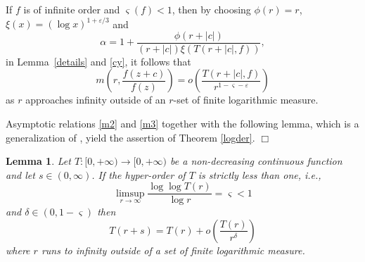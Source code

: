 \documentclass{amsart}
\newtheorem{lemma}[theorem]{Lemma}
\theoremstyle{definition}
\numberwithin{equation}{section}
\numberwithin{theorem}{section}
\begin{document}
If $f$ is of infinite order and $\varsigma(f)<1$, then by choosing
$\phi(r)= r$, $\xi(x)=(\log x)^{1+\varepsilon/3}$ and
    \begin{equation*}
    \alpha= 1+\frac{\phi(r+|c|)}{(r+|c|)\xi(T(r+|c|,f))},
    \end{equation*}
in Lemma~\ref{details} and \eqref{cy}, it follows that
    \begin{equation}\label{m3}
    m\left(r,\frac{f(z+c)}{f(z)}\right) =
    o\left(\frac{T(r+|c|,f)}{r^{1-\varsigma-\varepsilon}}\right)
    \end{equation}
as $r$ approaches infinity outside of an $r$-set of finite
logarithmic measure.

Asymptotic relations \eqref{m2} and
\eqref{m3} together with the following lemma, which is a
generalization of \cite[Lemma 2.1]{halburdk:07PLMS}, yield the
assertion of Theorem \ref{logder}. \hfill$\Box$

\begin{lemma}\label{technical}
Let $T:[0,+\infty)\to[0,+\infty)$ be a non-decreasing continuous
function and let $s\in(0,\infty)$. If the hyper-order of $T$ is
strictly less than one, i.e.,
    \begin{equation}\label{assu}
    \limsup_{r\to\infty}\frac{\log\log T(r)}{\log r}=\varsigma<1
    \end{equation}
and $\delta\in(0,1-\varsigma)$ then
   \begin{equation}\label{concl}
    T(r+s) = T(r)+ o\left(\frac{T(r)}{r^{\delta}}\right)
    \end{equation}
where $r$ runs to infinity outside of a set of finite logarithmic
measure.
\end{lemma}
\end{document}
